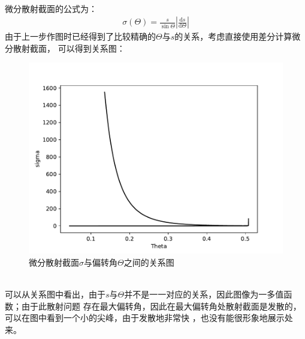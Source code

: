 \documentclass[a4paper]{ctexart}
\def\d{\mathrm{d}}
\begin{document}
    \\
    微分散射截面的公式为：
    \begin{align}
        \sigma(\Theta) = \frac{s}{\sin \Theta}\left|\frac{\d s}{\d \Theta}\right|
    \end{align}
    由于上一步作图时已经得到了比较精确的$\Theta$与$s$的关系，考虑直接使用差分计算微分散射截面，
    可以得到关系图：
    \\
    \begin{figure}[htbp]
        \centering
        \includegraphics[scale=0.70]{differential.pdf}
        \caption{微分散射截面$\sigma$与偏转角$\Theta$之间的关系图}
    \end{figure}
    \\
    可以从关系图中看出，由于$s$与$\Theta$并不是一一对应的关系，因此图像为一多值函数；由于此散射问题
    存在最大偏转角，因此在最大偏转角处散射截面是发散的，可以在图中看到一个小的尖峰，由于发散地非常快
    ，也没有能很形象地展示处来。
    \\
\end{document}
